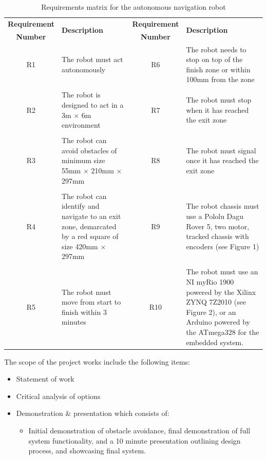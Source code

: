 \documentclass[a4paper]{article}
\begin{document}
\begin{table}[h]
\centering
\caption{Requirements matrix for the autonomous navigation robot}
\small
\begin{tabular}{cp{5.5cm}cp{5.5cm}}
\toprule
\textbf{Requirement} & \multirow{2}{*}{\textbf{Description}} & \textbf{Requirement} & \multirow{2}{*}{\textbf{Description}}\\
\textbf{Number} & & \textbf{Number} & \\
\midrule
R1 & The robot must act autonomously & R6 & The robot  needs to stop on top of the finish zone or within 100mm from the zone\\
 & & & \\
R2 & The robot is designed to act in a 3m $\times$ 6m environment & R7 & The robot must stop when it has reached the exit zone\\
 & & & \\
R3 & The robot can avoid obstacles of minimum size 55mm $\times$ 210mm $\times$ 297mm & R8 & The robot must signal once it has reached the exit zone\\
 & & & \\
R4 & The robot can identify and navigate to an exit zone, demarcated by a red square of size 420mm $\times$ 297mm & R9 & The robot chassis must use a Pololu Dagu Rover 5, two motor, tracked chassis with encoders (see Figure 1)\\
& & &\\
R5 & The robot must move from start to finish within 3 minutes & R10 & The robot must use an NI myRio 1900 powered by the Xilinx ZYNQ 7Z2010 (see Figure 2), or an Arduino powered by the ATmega328 for the embedded system.\\
\bottomrule
\end{tabular}
\end{table}

The scope of the project works include the following items:
\begin{itemize}
\item Statement of work
\item Critical analysis of options
\item Demonstration \& presentation which consists of:
\begin{itemize}
\item Initial demonstration of obstacle avoidance, final demonstration of full system functionality, and a 10 minute presentation outlining design process, and showcasing final system.
\end{itemize}
\end{itemize}
\end{document}
